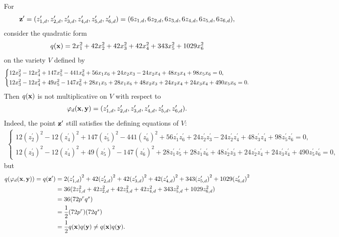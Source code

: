 \documentclass[a4paper, 11pt]{amsart}
\theoremstyle{plain}
\theoremstyle{definition}
\numberwithin{equation}{section}
\begin{document}
For
\[
{\bf z}^{\prime}=(z_{1,d}^{\prime},z_{2,d}^{\prime},z_{3,d}^{\prime},z_{4,d}^{\prime},z_{5,d}^{\prime},z_{6,d}^{\prime})
=(6z_{1,d},6z_{2,d},6z_{3,d},6z_{4,d},6z_{5,d},6z_{6,d}),
\]
consider the quadratic form
\[
q({\bf x})=2x_1^2+42x_2^2+42x_3^2+42x_4^2+343x_5^2+1029x_6^2
\]
on the variety $V$ defined by
\begin{align*}
\begin{dcases}
12x_2^2-12x_4^2+147x_5^2-441x_6^2+56x_1x_6+24x_2x_3
-24x_2x_4+48x_3x_4+98x_5x_6=0, \\
12x_3^2-12x_4^2+49x_5^2-147x_6^2+28x_1x_5+28x_1x_6+48x_2x_3+24x_2x_4+24x_3x_4+490x_5x_6=0.
\end{dcases}
\end{align*}
Then $q({\bf x})$ is not multiplicative on $V$ with respect to
\[
\varphi_d({\bf x},{\bf y})=(z_{1,d}^{\prime},z_{2,d}^{\prime},z_{3,d}^{\prime},z_{4,d}^{\prime},z_{5,d}^{\prime},z_{6,d}^{\prime}).
\]
Indeed, the point ${\bf z}^{\prime}$ still satisfies the defining equations of $V$:
\begin{align*}
\begin{cases}
12{(z^{\prime}_2)}^2-12{(z^{\prime}_4)}^2+147{(z^{\prime}_5)}^2-441{(z^{\prime}_6)}^2+56z^{\prime}_1z^{\prime}_6
+24z^{\prime}_2z^{\prime}_3-24z^{\prime}_2z^{\prime}_4+48z^{\prime}_3z^{\prime}_4+98z^{\prime}_5z^{\prime}_6=0, \\
12{(z^{\prime}_3)}^2-12{(z^{\prime}_4)}^2+49{(z^{\prime}_5)}^2-147{(z^{\prime}_6)}^2+28z^{\prime}_1z^{\prime}_5+28z^{\prime}_1z^{\prime}_6+48z^{\prime}_2z^{\prime}_3+24z^{\prime}_2z^{\prime}_4+24z^{\prime}_3z^{\prime}_4+490z^{\prime}_5z^{\prime}_6=0,
\end{cases}
\end{align*}
but
\begin{align*}
q(\varphi_d({\bf x},{\bf y}))=q({\bf z}^{\prime})
&=2{(z_{1,d}^{\prime})}^2+42{(z_{2,d}^{\prime})}^2+42{(z_{3,d}^{\prime})}^2+42{(z_{4,d}^{\prime})}^2+343{(z_{5,d}^{\prime})}^2+1029{(z_{6,d}^{\prime})}^2\\
&=36(2z_{1,d}^2+42z_{2,d}^2+42z_{3,d}^2+42z_{4,d}^2+343z_{5,d}^2+1029z_{6,d}^2)\\
&=36(72p^rq^s)\\
&=\frac{1}{2}(72p^r)(72q^s)\\
&=\frac{1}{2}q({\bf x})q({\bf y})
\neq q({\bf x})q({\bf y}).
\end{align*}
\end{document}
